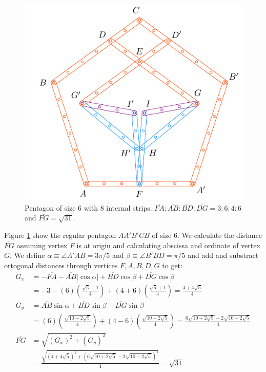 \documentclass[11pt]{article}
\begin{document}
\begin{figure}[h]
\centering
\includegraphics[scale=1.2]{6/penta6-8b}
\caption{Pentagon of size 6 with 8 internal strips. $\overline{FA} : \overline{AB} : \overline{BD} : \overline{DG} = 3:6:4:6$ and $\overline{FG} = \sqrt{31}$.}
\label{fig:penta6-8b}
\end{figure}

Figure \ref{fig:penta6-8b} show the regular pentagon $AA'B'CB$ of size $6$. We calculate the distance $\overline{FG}$ assuming vertex $F$ is at origin and calculating abscissa and ordinate of vertex $G$. We define $\alpha \equiv \angle{A'AB} = 3\pi / 5$ and $\beta \equiv \angle{B'BD} = \pi / 5$ and add and substract ortogonal distances through vertices $F,A,B,D,G$ to get:
\begin{align}
G_x &= -\overline{FA} -\overline{AB}|\cos\alpha| + \overline{BD}\cos\beta + \overline{DG}\cos\beta \nonumber\\
 &= -3 -(6)\left(\frac{\sqrt5 - 1}4\right) + (4+6)\left(\frac{\sqrt5+1}4\right)
 = \frac{4 + 4\sqrt5}4 \\
G_y &= \overline{AB}\sin\alpha + \overline{BD}\sin\beta - \overline{DG}\sin\beta \nonumber\\
 &= (6)\left(\frac{\sqrt{10+2\sqrt5}}4\right) + (4-6)\left(\frac{\sqrt{10-2\sqrt5}}4\right)
 = \frac{6\sqrt{10+2\sqrt5} - 2\sqrt{10-2\sqrt5}}4 \\
%
\overline{FG} &= \sqrt{(G_x)^2 + (G_y)^2} \nonumber\\
 &= \frac{\sqrt{(4+4\sqrt5)^2 + (6\sqrt{10+2\sqrt5} -2\sqrt{10-2\sqrt5})^2}}4
 = \sqrt{31}
\end{align}
\end{document}
